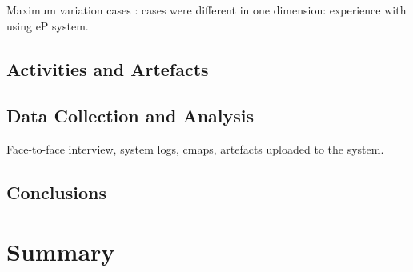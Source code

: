 Maximum variation cases \citep{Flyvbjerg2006}: cases were different in
one dimension: experience with using eP system.

\subsection{Activities and Artefacts}



\subsection{Data Collection and Analysis}

Face-to-face interview, system logs, cmaps, artefacts uploaded to the system.

\subsection{Conclusions}
 
\section{Summary}